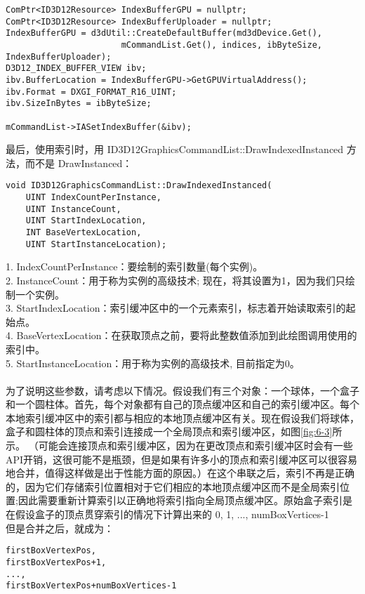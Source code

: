 \begin{flushleft}
\begin{lstlisting}
ComPtr<ID3D12Resource> IndexBufferGPU = nullptr;
ComPtr<ID3D12Resource> IndexBufferUploader = nullptr;
IndexBufferGPU = d3dUtil::CreateDefaultBuffer(md3dDevice.Get(), 
                       mCommandList.Get(), indices, ibByteSize, IndexBufferUploader);
D3D12_INDEX_BUFFER_VIEW ibv;
ibv.BufferLocation = IndexBufferGPU->GetGPUVirtualAddress();
ibv.Format = DXGI_FORMAT_R16_UINT;
ibv.SizeInBytes = ibByteSize;

mCommandList->IASetIndexBuffer(&ibv);
\end{lstlisting}
最后，使用索引时，用 ID3D12GraphicsCommandList::DrawIndexedInstanced 方法，而不是 DrawInstanced：\\
\begin{lstlisting}
void ID3D12GraphicsCommandList::DrawIndexedInstanced(
    UINT IndexCountPerInstance,
    UINT InstanceCount,
    UINT StartIndexLocation,
    INT BaseVertexLocation,
    UINT StartInstanceLocation);
\end{lstlisting}
1. IndexCountPerInstance：要绘制的索引数量(每个实例)。\\
2. InstanceCount：用于称为实例的高级技术; 现在，将其设置为1，因为我们只绘制一个实例。\\
3. StartIndexLocation：索引缓冲区中的一个元素索引，标志着开始读取索引的起始点。\\
4. BaseVertexLocation：在获取顶点之前，要将此整数值添加到此绘图调用使用的索引中。\\
5. StartInstanceLocation：用于称为实例的高级技术, 目前指定为0。\\
~\\
为了说明这些参数，请考虑以下情况。假设我们有三个对象：一个球体，一个盒子和一个圆柱体。首先，每个对象都有自己的顶点缓冲区和自己的索引缓冲区。每个本地索引缓冲区中的索引都与相应的本地顶点缓冲区有关。现在假设我们将球体，盒子和圆柱体的顶点和索引连接成一个全局顶点和索引缓冲区，如图\ref{fig:6-3}所示。 （可能会连接顶点和索引缓冲区，因为在更改顶点和索引缓冲区时会有一些API开销，这很可能不是瓶颈，但是如果有许多小的顶点和索引缓冲区可以很容易地合并，值得这样做是出于性能方面的原因。）在这个串联之后，索引不再是正确的，因为它们存储索引位置相对于它们相应的本地顶点缓冲区而不是全局索引位置;因此需要重新计算索引以正确地将索引指向全局顶点缓冲区。原始盒子索引是在假设盒子的顶点贯穿索引的情况下计算出来的 0, 1, ..., numBoxVertices-1\\
但是合并之后，就成为：\\
\begin{lstlisting}
firstBoxVertexPos,
firstBoxVertexPos+1,
...,
firstBoxVertexPos+numBoxVertices-1
\end{lstlisting}
 

\end{flushleft}
